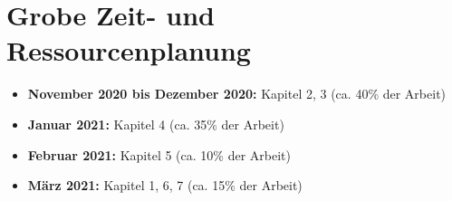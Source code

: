 \chapter{Grobe Zeit- und Ressourcenplanung}

\begin{itemize}
    \item \textbf{November 2020 bis Dezember 2020:} Kapitel 2, 3 (ca. 40\% der Arbeit)
    \item \textbf{Januar 2021:} Kapitel 4 (ca. 35\% der Arbeit)
    \item \textbf{Februar 2021:} Kapitel 5 (ca. 10\% der Arbeit)
    \item \textbf{März 2021:} Kapitel 1, 6, 7 (ca. 15\% der Arbeit)
\end{itemize}












